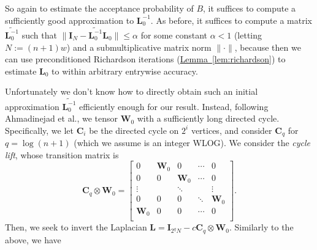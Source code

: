\documentclass[11pt]{article}
\numberwithin{equation}{section}
\theoremstyle{definition}
\theoremstyle{plain}
\newcommand{\expref}[2]{\hyperref[#2]{#1~\ref{#2}}}
\newcommand{\mC}{\mathbf{C}}
\newcommand{\mW}{\mathbf{W}}
\newcommand{\mL}{\mathbf{L}}
\newcommand{\I}{\mathbf{I}}
\newcommand{\Ltz}{\widetilde{\mathbf{L}_0^{-1}}}
\begin{document}
   So again to estimate the acceptance probability of $B$, it suffices to compute a sufficiently good approximation to $\mL_0^{-1}$.
   As before, it suffices to compute a matrix
   $\Ltz$ such that $\|\I_N-\Ltz \mL_0\| \leq \alpha$ for some constant $\alpha<1$ (letting $N:=(n+1)w$) and a submultiplicative matrix norm $\|\cdot\|$, because then we can use preconditioned Richardson iterations (\expref{Lemma}{lem:richardson}) to estimate $\mL_0$ to within arbitrary entrywise accuracy.
   
   Unfortunately %
%
%
%
%
   we don't know how to directly obtain such an initial approximation $\Ltz$ efficiently
enough for our result. Instead, following 
%
Ahmadinejad  %
et al., we tensor $\mW_0$ with a sufficiently long directed cycle.  Specifically, we let $\mC_i$ be the directed cycle on $2^i$ vertices, and consider $\mC_q$ for $q=\log(n+1)$ (which we assume is an integer WLOG). We consider the \emph{cycle lift}, whose transition matrix is
    $$\mC_q\otimes\mW_0 =
    \begin{bmatrix}
    0 & \mW_0 & 0 & \cdots & 0 \\
    0 & 0 & \mW_0 & \cdots & 0 \\
    \vdots & & \ddots & & \vdots\\
    0 & 0 & 0 & \ddots & \mW_0\\
    \mW_0 & 0 & 0 & \cdots &  0 \\
    \end{bmatrix}.$$  %
    Then, we seek to invert the Laplacian $\mL = \I_{2^qN} - c \mC_q \otimes \mW_0$.  Similarly
to the above, we have %
\end{document}
